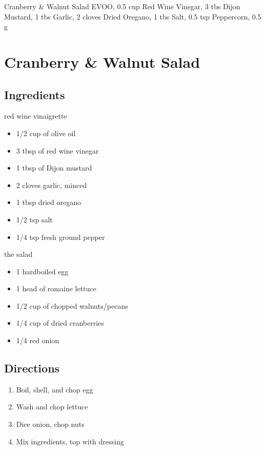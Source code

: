 Cranberry & Walnut Salad
  EVOO, 0.5 cup
  Red Wine Vinegar, 3 tbs
  Dijon Mustard, 1 tbs
  Garlic, 2 cloves
  Dried Oregano, 1 tbs
  Salt, 0.5 tsp
  Peppercorn, 0.5 g

\section{ Cranberry \& Walnut Salad }

\subsection{ Ingredients }

red wine vinaigrette

\begin{itemize}
  \item 1/2 cup of olive oil
  \item 3 tbsp of red wine vinegar
  \item 1 tbsp of Dijon mustard
  \item 2 cloves garlic, minced
  \item 1 tbsp dried oregano
  \item 1/2 tsp salt
  \item 1/4 tsp fresh ground pepper
\end{itemize}

the salad

\begin{itemize}
  \item 1 hardboiled egg
  \item 1 head of romaine lettuce
  \item 1/2 cup of chopped walnuts/pecans
  \item 1/4 cup of dried cranberries
  \item 1/4 red onion
\end{itemize}

\subsection{ Directions }

\begin{enumerate}
  \item Boil, shell, and chop egg
  \item Wash and chop lettuce
  \item Dice onion, chop nuts
  \item Mix ingredients, top with dressing
\end{enumerate}
